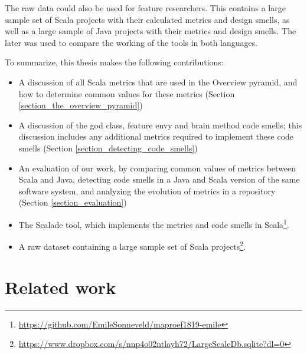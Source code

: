 \documentclass[onecolumn]{article}
\let\oldsection\section
\renewcommand\section{\clearpage\oldsection}
\begin{document}
The raw data could also be used for feature researchers. This contains a large sample set of Scala projects with their calculated metrics and design smells, as well as a large sample of Java projects with their metrics and design smells. The later was used to compare the working of the tools in both languages. 


To summarize, this thesis makes the following contributions:
\begin{itemize}
    \item A discussion of all Scala metrics that are used in the Overview pyramid, and how to determine common values for these metrics (Section \ref{section_the_overview_pyramid})
    \item A discussion of the god class, feature envy and brain method code smells; this discussion includes any additional metrics required to implement these code smells (Section \ref{section_detecting_code_smells})
    \item An evaluation of our work, by comparing common values of metrics between Scala and Java, detecting code smells in a Java and Scala version of the same software system, and analyzing the evolution of metrics in a repository (Section \ref{section_evaluation})
    \item The Scalade tool, which implements the metrics and code smells in Scala\footnote{\url{https://github.com/EmileSonneveld/maproef1819-emile}}.
    \item A raw dataset containing a large sample set of Scala projects\footnote{\url{https://www.dropbox.com/s/nnp4o02ntlayh72/LargeScaleDb.sqlite?dl=0}}.
\end{itemize}


\section{Related work}
\end{document}
